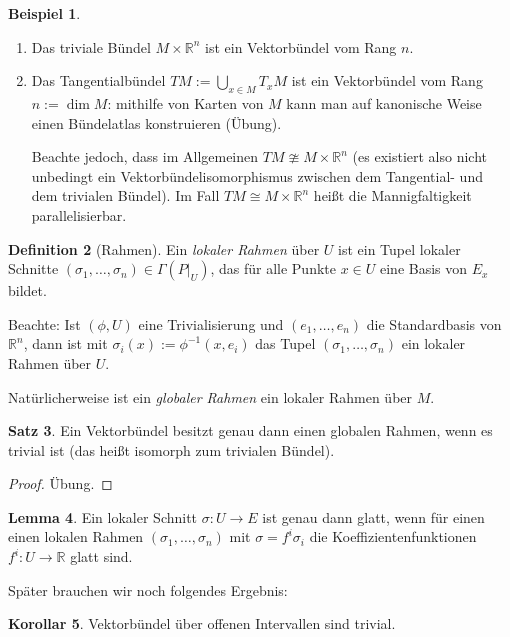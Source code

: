 \documentclass[a4paper]{scrreprt}
\numberwithin{equation}{chapter}
\newcommand{\R}{\mathbb{R}}
\theoremstyle{definition}
\newtheorem{defn}{Definition}[section]
\newtheorem{lemma}[defn]{Lemma}
\newtheorem{satz}[defn]{Satz}
\newtheorem{kor}[defn]{Korollar}
\newtheorem{bsp}[defn]{Beispiel}
\newcommand{\bewUeb}{\begin{proof}Übung.\end{proof}}
\begin{document}
		
		\begin{bsp}\hfill
			\begin{enumerate}
				\item Das triviale Bündel $M\times \R^n$ ist ein Vektorbündel vom Rang $n$.
				\item Das Tangentialbündel $TM:=\bigcup_{x\in M}T_xM$ ist ein Vektorbündel vom Rang $n:=\dim M$: mithilfe von Karten von $M$ kann man auf kanonische Weise einen Bündelatlas konstruieren (Übung).

					Beachte jedoch, dass im Allgemeinen $TM\ncong M\times \R^n$ (es existiert also nicht unbedingt ein Vektorbündelisomorphismus zwischen dem Tangential- und dem trivialen Bündel). Im Fall $TM\cong M\times \R^n$ heißt die Mannigfaltigkeit parallelisierbar.
			\end{enumerate}
		\end{bsp}
		\begin{defn}[Rahmen]
			Ein \emph{lokaler Rahmen} über $U$ ist ein Tupel lokaler Schnitte $(\sigma_1,\ldots,\sigma_n)\in\Gamma(P\vert_U)$, das für alle Punkte $x\in U$ eine Basis von $E_x$ bildet. 
			
			Beachte: Ist $(\phi,U)$ eine Trivialisierung und $(e_1,\ldots,e_n)$ die Standardbasis von $\R^n$, dann ist mit $\sigma_i(x):=\phi^{-1}(x,e_i)$ das Tupel $(\sigma_1,\ldots,\sigma_n)$ ein lokaler Rahmen über $U$.
			
			Natürlicherweise ist ein \emph{globaler Rahmen} ein lokaler Rahmen über $M$.
		\end{defn}
		\begin{satz}
			Ein Vektorbündel besitzt genau dann einen globalen Rahmen, wenn es trivial ist (das heißt isomorph zum trivialen Bündel).
			\bewUeb
		\end{satz}
		
		\begin{lemma}
			Ein lokaler Schnitt $\sigma\colon U\rightarrow E$ ist genau dann glatt, wenn für einen einen lokalen Rahmen $(\sigma_1,\ldots,\sigma_n)$ mit $\sigma=f^i\sigma_i$ die Koeffizientenfunktionen $f^i\colon U\rightarrow \R$ glatt sind. 
		\end{lemma}
		
		Später brauchen wir noch folgendes Ergebnis:
		\begin{kor}\label{kor:Vektorbündel_über_Intervallen}
			Vektorbündel über offenen Intervallen sind trivial.
		\end{kor}
\end{document}
